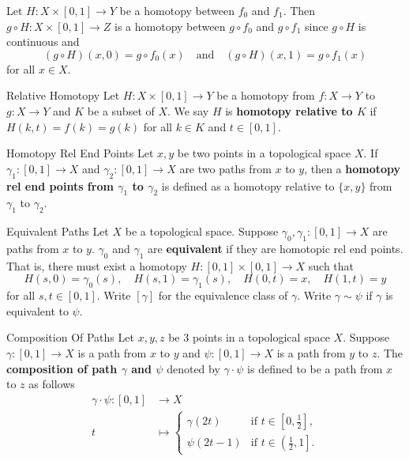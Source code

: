 \documentclass{report}
\begin{document}
\begin{prf} 
	Let $H:X\times [0,1]\to Y$ be a homotopy between $f_0$ and $f_1$. Then $g\circ H:X\times [0,1]\to Z$ is a homotopy between $g\circ f_0$ and $g\circ f_1$ since $g\circ H$ is continuous and
	\[
	(g\circ H)(x,0)=g\circ f_0(x)\quad\text{and}\quad (g\circ H)(x,1)=g\circ f_1(x)	
	\]
	for all $x\in X$.
\end{prf}

\begin{definition}{Relative Homotopy}{}
	Let $H: X \times[0,1] \rightarrow Y$ be a homotopy from $f:X\to Y$ to $g:X\to Y$ and $K$ be a subset of $X$. We say $H$ is \textbf{homotopy relative to $K$} if $H(k, t)=f(k)=g(k)$ for all $k \in K$ and $t \in[0,1]$. 
\end{definition}

\begin{definition}{Homotopy Rel End Points}{}
	Let $x,y$ be two points in a topological space $X$. If $\gamma_1:[0,1]\to X$ and $\gamma_2:[0,1]\to X$ are two paths from $x$ to $y$, then a \textbf{homotopy rel end points from $\gamma_1$ to $\gamma_2$} is defined as a homotopy relative to $\{x, y\}$ from $\gamma_1$ to $\gamma_2$.
\end{definition}

\begin{definition}{Equivalent Paths}{}
	Let $X$ be a topological space. Suppose $\gamma_0,\gamma_1: [0,1] \longrightarrow X$ are paths from $x$ to $y$. $\gamma_0$ and $\gamma_1$ are \textbf{equivalent} if they are homotopic rel end points. That is, there must exist a homotopy $H: [0,1] \times [0,1] \longrightarrow X$ such that
	$$
	H(s, 0)=\gamma_0(s), \quad H(s, 1)=\gamma_1(s), \quad H(0, t)=x, \quad H(1, t)=y
	$$
	for all $s,t \in [0,1]$. Write $[\gamma]$ for the equivalence class of $\gamma$. Write $\gamma\sim \psi$ if $\gamma$ is equivalent to $\psi$.
\end{definition}


\begin{definition}{Composition Of Paths}{}
	Let $x,y,z$ be $3$ points in a topological space $X$. Suppose $\gamma: [0,1] \longrightarrow X$ is a path from $x$ to $y$ and $\psi: [0,1] \longrightarrow X$ is a path from $y$ to $z$. The \textbf{composition of path $\gamma$ and $\psi$} denoted by $\gamma\cdot \psi$ is defined to be a path from $x$ to $z$ as follows
	\begin{align*}
		\gamma\cdot \psi:[0,1] &\longrightarrow X\\
		t &\longmapsto \begin{cases}
			\gamma(2t)&\text{if }t\in\left[0,\frac{1}{2}\right],\\
			\psi(2t-1)&\text{if }t\in\left(\left.\frac{1}{2},1\right]\right. .
		\end{cases}
	\end{align*}
\end{definition}
\end{document}
